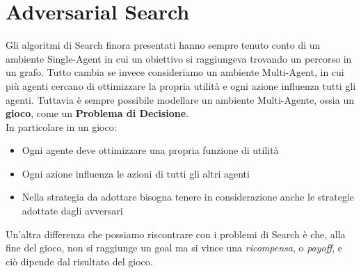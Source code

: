 \section{Adversarial Search}
Gli algoritmi di Search finora presentati hanno sempre tenuto conto di un ambiente Single-Agent in cui un obiettivo
si raggiungeva trovando un percorso in un grafo. Tutto cambia se invece consideriamo un ambiente Multi-Agent, in cui 
più agenti cercano di ottimizzare la propria utilità e ogni azione influenza tutti gli agenti. Tuttavia è sempre possibile
modellare un ambiente Multi-Agente, ossia un \textbf{gioco}, come un \textbf{Problema di Decisione}.\\
In particolare in un gioco:
\begin{itemize}
    \item Ogni agente deve ottimizzare una propria funzione di utilità
    \item Ogni azione influenza le azioni di tutti gli altri agenti
    \item Nella strategia da adottare bisogna tenere in considerazione anche le strategie adottate dagli avversari
\end{itemize}
Un'altra differenza che possiamo riscontrare con i problemi di Search è che, alla fine del gioco, non si raggiunge un goal
ma si vince una \textit{ricompensa}, o \textit{payoff}, e ciò dipende dal risultato del gioco.

